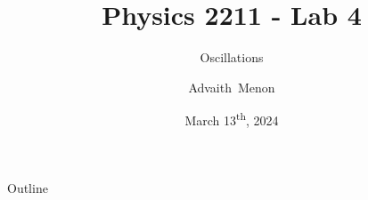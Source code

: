 \documentclass{beamer}
\title[PHYS-2211-Lab04] %
{Physics 2211 - Lab 4}
\subtitle
{Oscillations} %
\author[Menon, Advaith] %
{Advaith~Menon\inst{1}}
\institute%
{
  \inst{1}%
  Computer Engineering\\
  Georgia Institute of Technology
  }
\date%
{March 13\textsuperscript{th}, 2024}
\begin{document}
\begin{frame}
  \titlepage
\end{frame}

\begin{frame}{Outline}
  \tableofcontents
\end{frame}









\end{document}
